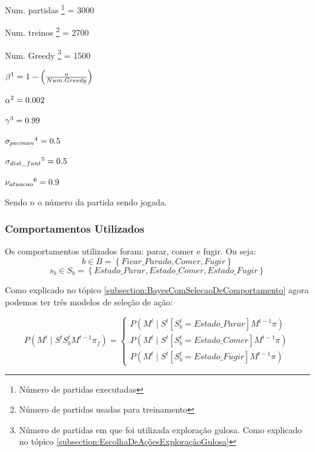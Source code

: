 \begin{multicols}{2}

Num. partidas%
\footnote{Número de partidas executadas%
} = 3000

Num. treinos%
\footnote{Número de partidas usadas para treinamento%
} = 2700

Num. Greedy%
\footnote{Número de partidas em que foi utilizada exploração gulosa. Como explicado no tópico \ref{subsection:EscolhaDeAçõesExploraçãoGulosa}%
} = 1500

$ \beta%
\footnote{Fator de exploração gulosa utilizado.%
} = 1 - \left( \frac{n}{Num. Greedy} \right) $

$ \alpha%
\footnote{Fator de Aprendizagem%
} = 0.002 $

$ \gamma%
\footnote{Fator de Desconto%
} = 0.99 $

$ \sigma_{pacman}%
\footnote{Desvio padrão do erro gaussiano da posição recebida do Pacman%
} = 0.5 $

$ \sigma_{dist\_fant}%
\footnote{Desvio padrão do erro gaussiano da distância recebida para os Fantasmas%
} = 0.5 $

$ \nu_{atuacao}%
\footnote{Fator de Acerto na movimentação do Pacman. Descrito no algorítmo \ref{algorithm:ErroAtuacao} na seção \ref{section:AmbienteDeTestes}%
} = 0.9 $

\end{multicols}

Sendo $ n $ o número da partida sendo jogada.

\subsubsection{Comportamentos Utilizados} \label{subsubsection:3ComportamentosUtilizados}

Os comportamentos utilizados foram: parar, comer e fugir. Ou seja:
$$ b \in B = \left\{ Ficar\_Parado, Comer, Fugir \right\} $$
$$ s_b \in S_b = \left\{ Estado\_Parar, Estado\_Comer, Estado\_Fugir \right\} $$

Como explicado no tópico \ref{subsection:BayesComSelecaoDeComportamento} agora podemos ter três modelos de seleção de ação: 

\begin{equation}
    P \left( M^t \mid S^t S_b^t M^{t-1} \pi_f \right) = 
        \left\{
            \begin{array}{l}
                P \left( M^t \mid S^t \left[ S_b^t=Estado\_Parar \right] M^{t-1} \pi \right) \\
                P \left( M^t \mid S^t \left[ S_b^t=Estado\_Comer \right] M^{t-1} \pi \right) \\
                P \left( M^t \mid S^t \left[ S_b^t=Estado\_Fugir \right] M^{t-1} \pi \right)
            \end{array}
        \right.
\end{equation}

